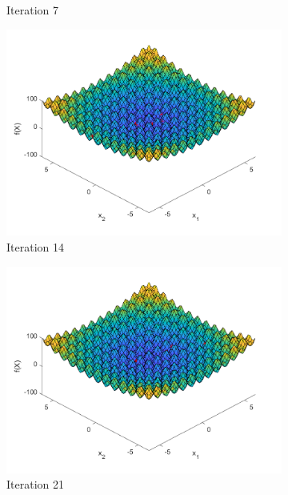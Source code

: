 \begin{figure}
\begin{subfigure}[b]{0.4\textwidth}
    \caption{Iteration 7}
    \label{fig:s4-iter-1}
  \end{subfigure}
  \begin{subfigure}[b]{0.4\textwidth}
    \includegraphics[width=\textwidth]{img/smpl/rast2d/loa-iter-14}
    \caption{Iteration 14}
    \label{fig:s4-iter-2}
  \end{subfigure}
  \begin{subfigure}[b]{0.4\textwidth}
    \includegraphics[width=\textwidth]{img/smpl/rast2d/loa-iter-21}
    \caption{Iteration 21}
    \label{fig:s4-iter-3}
  \end{subfigure}
  \begin{subfigure}[b]{0.4\textwidth}

\end{subfigure}
\end{figure}
